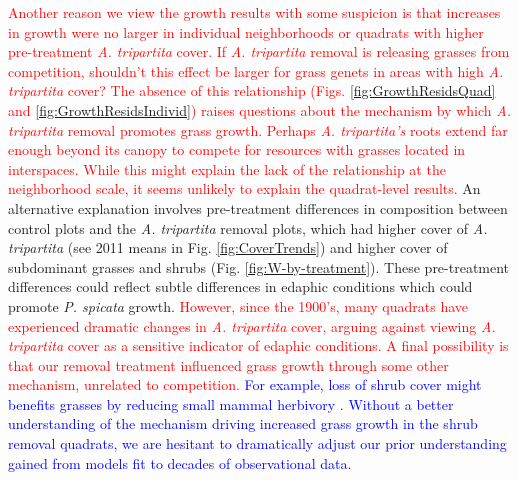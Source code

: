 \documentclass[11pt]{article}
\newcommand{\new}{\textcolor{red}}
\newcommand{\spe}{\textcolor{blue}}
\begin{document}
\begin{doublespacing}
\new{Another reason we view the growth results with some suspicion is that increases in growth were no larger in individual neighborhoods or quadrats with higher pre-treatment \textit{A. tripartita} cover. If \textit{A. tripartita} removal is releasing grasses from competition, shouldn't this effect be larger for grass genets in areas with high \textit{A. tripartita} cover? The absence of this relationship (Figs. \ref{fig:GrowthResidsQuad} and \ref{fig:GrowthResidsIndivid}) raises questions about the mechanism by which \textit{A. tripartita} removal promotes grass growth. Perhaps \textit{A. tripartita's} roots extend far enough beyond its canopy to compete for resources with grasses located in interspaces. While this might explain the lack of the relationship at the neighborhood scale, it seems unlikely to explain the quadrat-level results.}
An alternative explanation involves pre-treatment differences in composition between control plots and  the \textit{A. tripartita} removal plots, which had higher cover of \textit{A. tripartita} (see 2011 means in Fig. \ref{fig:CoverTrends}) and higher cover of subdominant grasses and shrubs (Fig. \ref{fig:W-by-treatment}). These pre-treatment differences could reflect subtle differences in edaphic conditions which could promote \textit{P. spicata} growth. \new{However, since the 1900's, many quadrats have experienced dramatic changes in \textit{A. tripartita} cover, arguing against viewing \textit{A. tripartita} cover as a sensitive indicator of edaphic conditions. 
A final possibility is that our removal treatment influenced grass growth through some other mechanism, unrelated to competition.} 
\spe{For example, loss of shrub cover might benefits grasses by reducing small mammal herbivory \citep{Orrock2010}. 
Without a better understanding of the mechanism driving increased grass growth in the shrub removal quadrats, 
we are hesitant to dramatically adjust our prior understanding gained from models fit to decades of observational data.  }


\end{doublespacing}
\end{document}
